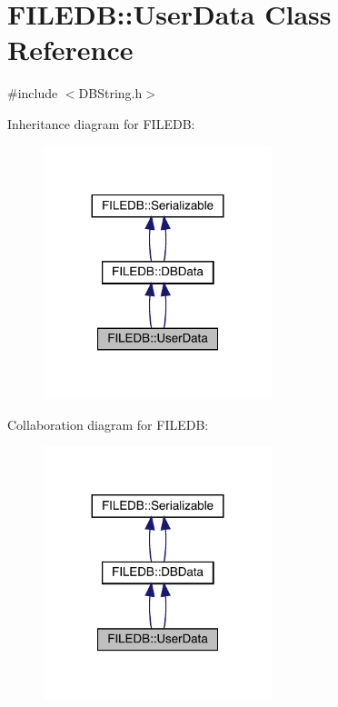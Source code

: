 \hypertarget{classFILEDB_1_1UserData}{}\section{F\+I\+L\+E\+DB\+:\+:User\+Data Class Reference}
\label{classFILEDB_1_1UserData}


{\ttfamily \#include $<$D\+B\+String.\+h$>$}



Inheritance diagram for F\+I\+L\+E\+DB\+:\nopagebreak
\begin{figure}[H]
\begin{center}
\leavevmode
\includegraphics[width=188pt]{d4/d81/classFILEDB_1_1UserData__inherit__graph}
\end{center}
\end{figure}


Collaboration diagram for F\+I\+L\+E\+DB\+:\nopagebreak
\begin{figure}[H]
\begin{center}
\leavevmode
\includegraphics[width=188pt]{d6/d67/classFILEDB_1_1UserData__coll__graph}
\end{center}
\end{figure}
